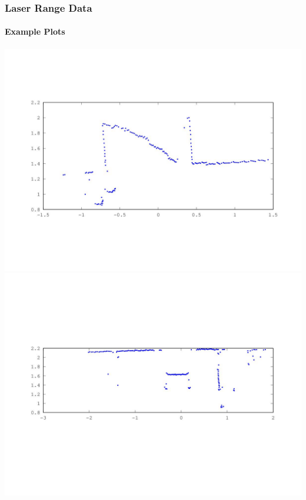 \documentclass{beamer}
\begin{document}
\begin{frame}
\frametitle{Laser Range Data}
\framesubtitle{Example Plots}

\includegraphics[scale=0.25]{presimg/doorhalf.jpg}
\includegraphics[scale=0.25]{presimg/chair.jpg}


\end{frame}
\end{document}
